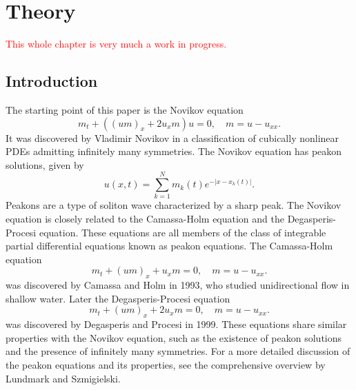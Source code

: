\documentclass[english,master]{liumaiex}
\theoremstyle{plain}
\theoremstyle{definition}
\newcommand\todo[1]{\textcolor{red}{#1}}
\begin{document}




\tableofcontents




%
%
\mainmatter

\chapter{Theory}
\todo{This whole chapter is very much a work in progress.}

\section{Introduction}
The starting point of this paper is the Novikov equation
\begin{equation} \label{eq:Novikov}
	m_t + ((um)_x + 2u_xm) u = 0,\quad m = u - u_{xx}.
\end{equation}
It was discovered by Vladimir Novikov in a classification of cubically nonlinear PDEs admitting infinitely many symmetries\cite{Novikov_2009}. The Novikov equation has peakon solutions, given by
\begin{equation} \label{eq:peakon}
	u(x, t) = \sum_{k = 1}^{N} m_k(t) e^{-|x - x_k(t)|}.
\end{equation}
Peakons are a type of soliton wave characterized by a sharp peak.
The Novikov equation is closely related to the Camassa-Holm equation and the Degasperis-Procesi equation. These equations are all members of the class of integrable partial differential equations known as peakon equations. The Camassa-Holm equation
\begin{equation} \label{eq:CH}
	m_t + (um)_x + u_xm = 0,\quad m = u - u_{xx}.
\end{equation}
was discovered by Camassa and Holm in 1993\cite{Camassa_1993}, who studied unidirectional flow in shallow water.
Later the Degasperis-Procesi equation
\begin{equation} \label{eq:DP}
	m_t + (um)_x + 2u_xm = 0,\quad m = u - u_{xx}.
\end{equation}
was discovered by Degasperis and Procesi in 1999\cite{Degasperis_1999}. These equations share similar properties with the Novikov equation, such as the existence of peakon solutions and the presence of infinitely many symmetries. For a more detailed discussion of the peakon equations and its properties, see the comprehensive overview by Lundmark and Szmigielski\cite{Lundmark_2022}.
\end{document}
